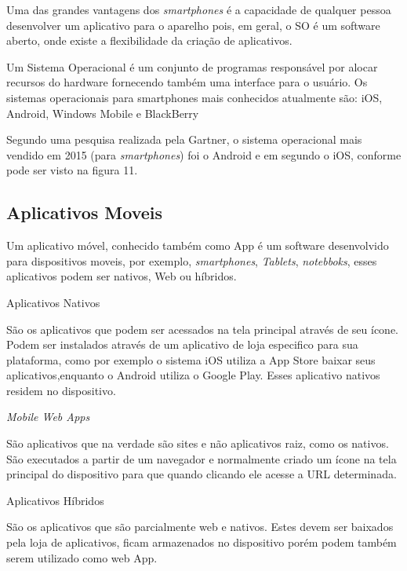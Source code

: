 Uma das grandes vantagens dos \textit{smartphones} é a capacidade de qualquer pessoa desenvolver um aplicativo para o aparelho pois, em geral, o SO é um software aberto, onde existe a flexibilidade da criação de aplicativos.

Um Sistema Operacional é um conjunto de programas responsável por alocar recursos do hardware fornecendo também uma interface para o usuário. Os sistemas operacionais para smartphones mais conhecidos atualmente são: iOS, Android, Windows Mobile e BlackBerry

Segundo uma pesquisa realizada pela Gartner, o sistema operacional mais vendido em 2015 (para \textit{smartphones}) foi o Android e em segundo o iOS, conforme pode ser visto na figura 11.
\begin{figure}[h!]
		\centering
	\end{figure}

\subsection{Aplicativos Moveis}
Um aplicativo móvel, conhecido também como App é um software desenvolvido para dispositivos moveis, por exemplo, \textit{smartphones},  \textit{Tablets}, \textit{notebboks}, esses aplicativos podem ser nativos, Web ou híbridos.

\begin{alineascomponto}

\item Aplicativos Nativos

São os aplicativos que podem ser acessados na tela principal através de seu ícone. Podem ser instalados através de um aplicativo de loja especifico para sua plataforma, como por exemplo o sistema iOS utiliza a App Store baixar seus aplicativos,enquanto o Android utiliza o Google Play. Esses aplicativo nativos residem no dispositivo.

\item \textit{Mobile Web Apps}

São aplicativos que na verdade são sites e não aplicativos raiz, como os nativos. São executados a partir de um navegador e normalmente criado um ícone na tela principal do dispositivo para que quando clicando ele acesse a URL determinada.

\item Aplicativos Híbridos

São os aplicativos que são parcialmente web e nativos.
Estes devem ser baixados pela loja de aplicativos, ficam armazenados no dispositivo porém podem também serem utilizado como web App.

	\end{alineascomponto}
	
